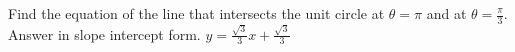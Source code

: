 {Find the equation of the line that intersects the unit circle at $\theta = \pi$ and at $\theta=\frac{\pi}{3}$. Answer in slope intercept form.}
{$y=\frac{\sqrt{3}}{3} x+\frac{\sqrt{3}}{3}$}
